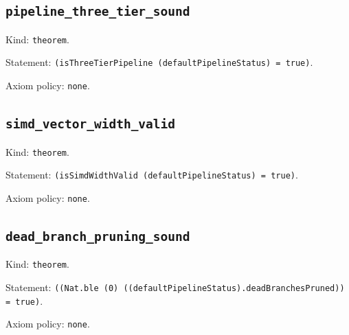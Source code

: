 \documentclass[11pt]{article}
\begin{document}
\subsection*{\texttt{pipeline\_three\_tier\_sound}}
\noindent Kind: \texttt{theorem}.\par
\noindent Statement: \texttt{(isThreeTierPipeline (defaultPipelineStatus) = true)}.\par
\noindent Axiom policy: \texttt{none}.\par
\subsection*{\texttt{simd\_vector\_width\_valid}}
\noindent Kind: \texttt{theorem}.\par
\noindent Statement: \texttt{(isSimdWidthValid (defaultPipelineStatus) = true)}.\par
\noindent Axiom policy: \texttt{none}.\par
\subsection*{\texttt{dead\_branch\_pruning\_sound}}
\noindent Kind: \texttt{theorem}.\par
\noindent Statement: \texttt{((Nat.ble (0) ((defaultPipelineStatus).deadBranchesPruned)) = true)}.\par
\noindent Axiom policy: \texttt{none}.\par
\end{document}

